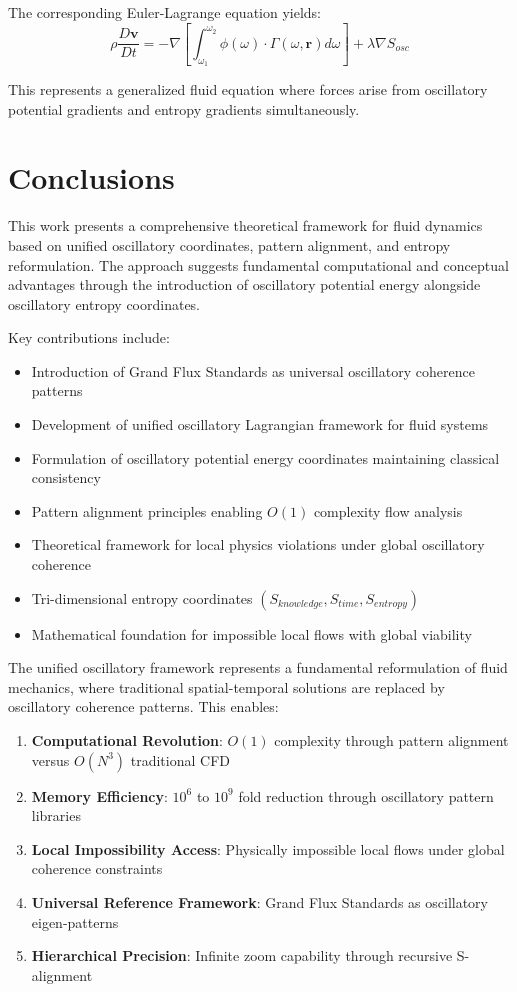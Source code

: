 \documentclass[12pt,a4paper]{article}
\begin{document}
The corresponding Euler-Lagrange equation yields:
\begin{equation}
\rho \frac{D\mathbf{v}}{Dt} = -\nabla \left[\int_{\omega_1}^{\omega_2} \phi(\omega) \cdot \Gamma(\omega, \mathbf{r}) d\omega\right] + \lambda \nabla S_{osc}
\end{equation}

This represents a generalized fluid equation where forces arise from oscillatory potential gradients and entropy gradients simultaneously.

\section{Conclusions}

This work presents a comprehensive theoretical framework for fluid dynamics based on unified oscillatory coordinates, pattern alignment, and entropy reformulation. The approach suggests fundamental computational and conceptual advantages through the introduction of oscillatory potential energy alongside oscillatory entropy coordinates.

Key contributions include:
\begin{itemize}
\item Introduction of Grand Flux Standards as universal oscillatory coherence patterns
\item Development of unified oscillatory Lagrangian framework for fluid systems
\item Formulation of oscillatory potential energy coordinates maintaining classical consistency
\item Pattern alignment principles enabling $O(1)$ complexity flow analysis
\item Theoretical framework for local physics violations under global oscillatory coherence
\item Tri-dimensional entropy coordinates $(S_{knowledge}, S_{time}, S_{entropy})$
\item Mathematical foundation for impossible local flows with global viability
\end{itemize}

The unified oscillatory framework represents a fundamental reformulation of fluid mechanics, where traditional spatial-temporal solutions are replaced by oscillatory coherence patterns. This enables:

\begin{enumerate}
\item \textbf{Computational Revolution}: $O(1)$ complexity through pattern alignment versus $O(N^3)$ traditional CFD
\item \textbf{Memory Efficiency}: $10^6$ to $10^9$ fold reduction through oscillatory pattern libraries
\item \textbf{Local Impossibility Access}: Physically impossible local flows under global coherence constraints
\item \textbf{Universal Reference Framework}: Grand Flux Standards as oscillatory eigen-patterns
\item \textbf{Hierarchical Precision}: Infinite zoom capability through recursive S-alignment
\end{enumerate}
\end{document}

